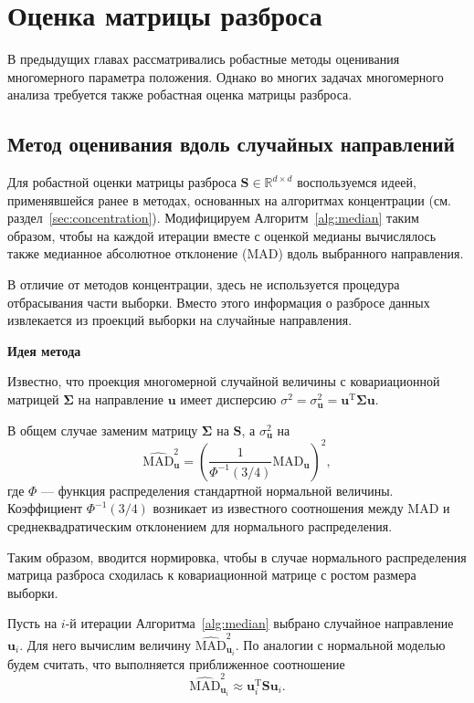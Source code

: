 \chapter{Оценка матрицы разброса}

В предыдущих главах рассматривались робастные методы оценивания многомерного параметра положения. Однако во многих задачах многомерного анализа требуется также робастная оценка матрицы разброса.

\section{Метод оценивания вдоль случайных направлений}

Для робастной оценки матрицы разброса $\mathbf{S} \in \mathbb{R}^{d \times d}$ воспользуемся идеей, применявшейся ранее в методах, основанных на алгоритмах концентрации (см. раздел~\ref{sec:concentration}). Модифицируем Алгоритм~\ref{alg:median} таким образом, чтобы на каждой итерации вместе с оценкой медианы вычислялось также медианное абсолютное отклонение ($\mathrm{MAD}$) вдоль выбранного направления.

В отличие от методов концентрации, здесь не используется процедура отбрасывания части выборки. Вместо этого информация о разбросе данных извлекается из проекций выборки на случайные направления.

\textbf{Идея метода}

Известно, что проекция многомерной случайной величины с ковариационной матрицей $\boldsymbol{\Sigma}$ на направление $\mathbf{u}$ имеет дисперсию $\sigma^2 = \sigma^2_{\mathbf{u}} = \mathbf{u}^{\mathrm{T}} \boldsymbol{\Sigma} \mathbf{u}$.

В общем случае заменим матрицу $\boldsymbol{\Sigma}$  на $\mathbf{S}$, а $\sigma^2_{\mathbf{u}}$ на
\begin{equation}\label{eq:mad}
    \widehat{\text{MAD}}^2_{\mathbf{u}} = \left(\frac{1}{\Phi^{-1}(3/4)} \text{MAD}_{\mathbf{u}}\right)^2,
\end{equation}
где $\Phi$ ---  функция распределения стандартной нормальной величины. Коэффициент $\Phi^{-1}(3/4)$ возникает из известного соотношения между MAD и среднеквадратическим отклонением для нормального распределения.

Таким образом, вводится нормировка, чтобы в случае нормального распределения матрица разброса сходилась к ковариационной матрице с ростом размера выборки. 

Пусть на $i$-й итерации Алгоритма~\ref{alg:median} выбрано случайное направление $\mathbf{u}_i$. Для него вычислим величину $\widehat{\mathrm{MAD}}_{\mathbf{u}_i}^2$. По аналогии с нормальной моделью будем считать, что выполняется приближенное соотношение
\begin{equation}\label{eq_mad}
    \widehat{\mathrm{MAD}}_{\mathbf{u}_i}^2
    \approx
    \mathbf{u}^{\mathrm{T}}_i\mathbf{S}\mathbf{u}_i.
\end{equation}

